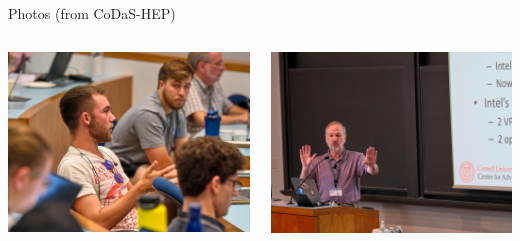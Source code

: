 \documentclass[aspectratio=169]{beamer}
\begin{document}
\begin{frame}{Photos (from CoDaS-HEP)}
\begin{columns}
\end{columns}

\begin{columns}
\includegraphics[width=\linewidth]{PHOTOS/DSCF2928.jpg}

\includegraphics[width=\linewidth]{PHOTOS/DSCF2805.jpg}


\end{columns}
\end{frame}
\end{document}
